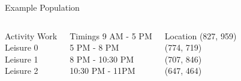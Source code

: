 \documentclass[10pt, aspectratio=169]{beamer}
\begin{document}
    \begin{frame}{Example Population}
        \begin{columns}[T,onlytextwidth]
        
    
        
            \begin{block}{Activity}
            Work\\
            \vspace{1em}
            Leisure 0\\
            \vspace{1em}
            Leisure 1\\
            \vspace{1em}
            Leisure 2\\
            \vspace{1em}
            \end{block}
    
    
        
            \begin{alertblock}{Timings}
            9 AM - 5 PM\\
            \vspace{1em}
            5 PM - 8 PM\\
            \vspace{1em}
            8 PM - 10:30 PM\\
            \vspace{1em}
            10:30 PM - 11PM\\
            \vspace{1em}
            \end{alertblock}
    
    
    
            \begin{exampleblock}{Location}
                (827, 959)\\
                \vspace{0.92em}
                (774, 719)\\
                \vspace{0.92em}
                (707, 846)\\
                \vspace{0.92em}
                (647, 464)\\
                \vspace{0.92em}
            \end{exampleblock}
            
        \end{columns}
    \end{frame}
    
\end{document}
